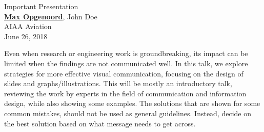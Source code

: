 \documentclass[aspectratio=1610,8pt]{beamer}
\begin{document}
{%
\begin{frame}[plain]

    \begin{minipage}[t]{0.49\textwidth}
        {\huge Important Presentation} \vspace{0.75pc} \\
        {\large \underline{\textbf{Max Opgenoord}}, John Doe} \vspace{1.5pc} \\
        AIAA Aviation \\
        June 26, 2018
    \end{minipage}
    \hspace{0.05\textwidth}
    \begin{minipage}[t]{0.4\textwidth}
      Even when research or engineering work is groundbreaking, its impact can be limited when the findings are not communicated well. In this talk, we explore strategies for more effective visual communication, focusing on the design of slides and graphs/illustrations. This will be mostly an introductory talk, reviewing the work by experts in the field of communication and information design, while also showing some examples.
      The solutions that are shown for some common mistakes, should not be used as general guidelines. Instead, decide on the best solution based on what message needs to get across.
    \end{minipage}

\end{frame}

}
\end{document}
